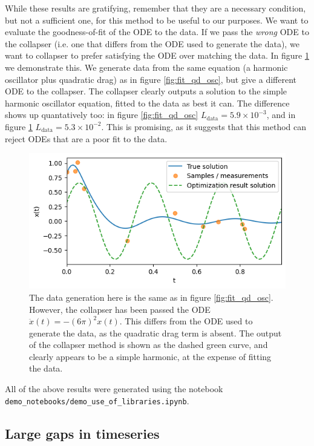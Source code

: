 \documentclass{article}
\begin{document}
While these results are gratifying, remember that they are a necessary condition, but not a sufficient one, for this method to be useful to our purposes.
We want to evaluate the goodness-of-fit of the ODE to the data.
If we pass the \emph{wrong} ODE to the collapser (i.e. one that differs from the ODE used to generate the data), we want to collapser to prefer satisfying the ODE over matching the data.
In figure \ref{fig:badfit_qd_osc_sho} we demonstrate this.
We generate data from the same equation (a harmonic oscillator plus quadratic drag) as in figure \ref{fig:fit_qd_osc}, but give a different ODE to the collapser.
The collapser clearly outputs a solution to the simple harmonic oscillator equation, fitted to the data as best it can.
The difference shows up quantatively too: in figure \ref{fig:fit_qd_osc} $L_{\mathrm{data}} = 5.9 \times 10^{-3}$, and in figure \ref{fig:badfit_qd_osc_sho} $L_{\mathrm{data}} = 5.3 \times 10^{-2}$.
This is promising, as it suggests that this method can reject ODEs that are a poor fit to the data.

\begin{figure}
\includegraphics{images/results/badfit_qd_osc_sho.png}
\centering
\caption{
The data generation here is the same as in figure \ref{fig:fit_qd_osc}.
However, the collapser has been passed the ODE $\ddot{x}(t) = - (6\pi)^2 x(t)$.
This differs from the ODE used to generate the data, as the quadratic drag term is absent.
The output of the collapser method is shown as the dashed green curve, and clearly appears to be a simple harmonic, at the expense of fitting the data.
}
\label{fig:badfit_qd_osc_sho}
\end{figure}

All of the above results were generated using the notebook \texttt{demo\_notebooks/demo\_use\_of\_libraries.ipynb}.

\subsection{Large gaps in timeseries}
\end{document}
